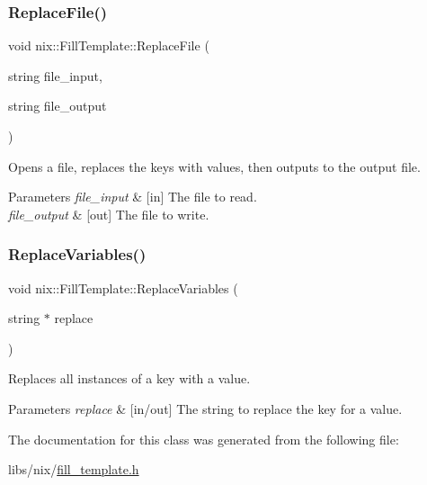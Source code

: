 \subsubsection{\texorpdfstring{Replace\+File()}{ReplaceFile()}}
{\footnotesize\ttfamily void nix\+::\+Fill\+Template\+::\+Replace\+File (\begin{DoxyParamCaption}\item[{string}]{file\+\_\+input,  }\item[{string}]{file\+\_\+output }\end{DoxyParamCaption})\hspace{0.3cm}{\ttfamily [inline]}}



Opens a file, replaces the keys with values, then outputs to the output file. 


\begin{DoxyParams}{Parameters}
{\em file\+\_\+input} & \mbox{[}in\mbox{]} The file to read. \\
\hline
{\em file\+\_\+output} & \mbox{[}out\mbox{]} The file to write. \\
\hline
\end{DoxyParams}
\mbox{\label{classnix_1_1FillTemplate_a34270ff9a51bf5fad588dacf86bd834e}} 
\subsubsection{\texorpdfstring{Replace\+Variables()}{ReplaceVariables()}}
{\footnotesize\ttfamily void nix\+::\+Fill\+Template\+::\+Replace\+Variables (\begin{DoxyParamCaption}\item[{string $\ast$}]{replace }\end{DoxyParamCaption})\hspace{0.3cm}{\ttfamily [inline]}}



Replaces all instances of a key with a value. 


\begin{DoxyParams}{Parameters}
{\em replace} & \mbox{[}in/out\mbox{]} The string to replace the key for a value. \\
\hline
\end{DoxyParams}


The documentation for this class was generated from the following file\+:\begin{DoxyCompactItemize}
\item 
libs/nix/\hyperlink{fill__template_8h}{fill\+\_\+template.\+h}\end{DoxyCompactItemize}
